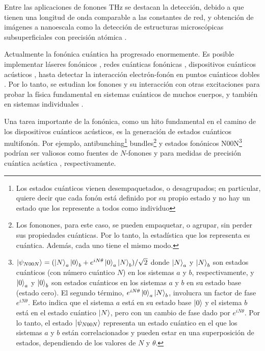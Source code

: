 \documentclass[main.tex]{subfiles}
\begin{document}
Entre las aplicaciones de fonones THz se destacan la detección, debido a que tienen una longitud de onda comparable a las constantes de red, y obtención de imágenes a nanoescala como la detección de estructuras microscópicas subsuperficiales con precisión atómica \parencite{Bin2020}.

Actualmente la fonónica cuántica ha progresado enormemente. Es posible implementar láseres fonónicos \parencite{Kabuss2012}, redes cuánticas fonónicas \parencite{Lemonde2018}, dispositivos cuánticos acústicos \parencite{Schütz2017}, hasta detectar la interacción electrón-fonón en puntos cuánticos dobles \parencite{Hartke2018}. Por lo tanto, se estudian los fonones y su interacción con otras excitaciones para probar la física fundamental en sistemas cuánticos de muchos cuerpos, y también en sistemas individuales \parencite{Lupke2022}.

Una tarea importante de la fonónica, como un hito fundamental en el camino de los dispositivos cuánticos acústicos, es la generación de estados cuánticos multifonón. Por ejemplo, antibunching\footnote{Los estados cuánticos vienen desempaquetados, o desagrupados; en particular, quiere decir que cada fonón está definido por su propio estado y no hay un estado que los represente a todos como individuo} bundles\footnote{Los fononones, para este caso, se pueden empaquetar, o agrupar, sin perder sus propiedades cuánticas. Por lo tanto, la estadística que los representa es cuántica. Además, cada uno tiene el mismo modo.} y estados fonónicos N00N\footnote{$\ket{\psi_{N00N}}=(\ket{N}_a \ket{0}_b + e^{iN\theta} \ket{0}_a \ket{N}_b)/\sqrt{2}$ donde \(\ket{N}_a\) y \(\ket{N}_b\) son estados cuánticos (con número cuántico $N$) en los sistemas $a$ y $b$, respectivamente, y \(\ket{0}_a\) y \(\ket{0}_b\) son estados cuánticos en los sistemas $a$ y $b$ en su estado base (estado cero). El segundo término, \(e^{iN\theta} \ket{0}_a \ket{N}_b\), involucra un factor de fase \(e^{iN\theta}\). Esto indica que el sistema $a$ está en su estado base \(\ket{0}\) y el sistema $b$ está en el estado cuántico \(\ket{N}\), pero con un cambio de fase dado por \(e^{iN\theta}\). Por lo tanto, el estado $\ket{\psi_{N00N}}$ representa un estado cuántico en el que los sistemas $a$ y $b$ están correlacionados y pueden estar en una superposición de estados, dependiendo de los valores de \(N\) y \(\theta\).} podrían ser valiosos como fuentes de $N$-fonones \parencite{Chu2018} y para medidas de precisión cuántica acústica \parencite{Toyoda2015}, respectivamente. 
\end{document}
